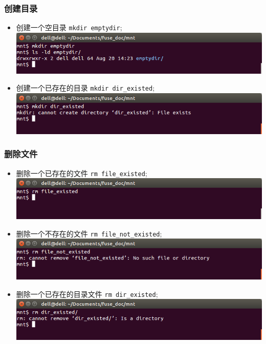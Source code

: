 \documentclass[nofonts, titlepage]{ctexart}
\begin{document}
\subsubsection{创建目录}
\begin{itemize}
\item
  创建一个空目录 \texttt{mkdir emptydir};\\
  \includegraphics[width=14cm]{./images/./mkdir_t1.png}
\item
  创建一个已存在的目录 \texttt{mkdir dir\_existed};\\
  \includegraphics[width=14cm]{./images/./mkdir_t2.png}
\end{itemize}
\subsubsection{删除文件}
\begin{itemize}
\item
  删除一个已存在的文件 \texttt{rm file\_existed};\\
  \includegraphics[width=14cm]{./images/./rm_t1.png}
\item
  删除一个不存在的文件 \texttt{rm file\_not\_existed};\\
  \includegraphics[width=14cm]{./images/./rm_t2.png}
\item
  删除一个已存在的目录文件 \texttt{rm dir\_existed};\\
  \includegraphics[width=14cm]{./images/./rm_t3.png}
\end{itemize}
\end{document}
